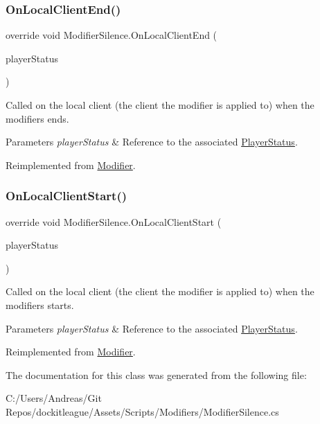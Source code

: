 \subsubsection{\texorpdfstring{On\+Local\+Client\+End()}{OnLocalClientEnd()}}
{\footnotesize\ttfamily override void Modifier\+Silence.\+On\+Local\+Client\+End (\begin{DoxyParamCaption}\item[{\hyperlink{class_player_status}{Player\+Status}}]{player\+Status }\end{DoxyParamCaption})\hspace{0.3cm}{\ttfamily [virtual]}}



Called on the local client (the client the modifier is applied to) when the modifiers ends. 


\begin{DoxyParams}{Parameters}
{\em player\+Status} & Reference to the associated \hyperlink{class_player_status}{Player\+Status}.\\
\hline
\end{DoxyParams}


Reimplemented from \hyperlink{class_modifier_a1ea2aa04b05628c1965570396e390281}{Modifier}.

\hypertarget{class_modifier_silence_a46d7fc89d95ab9e45013d79949254288}{}\label{class_modifier_silence_a46d7fc89d95ab9e45013d79949254288} 
\subsubsection{\texorpdfstring{On\+Local\+Client\+Start()}{OnLocalClientStart()}}
{\footnotesize\ttfamily override void Modifier\+Silence.\+On\+Local\+Client\+Start (\begin{DoxyParamCaption}\item[{\hyperlink{class_player_status}{Player\+Status}}]{player\+Status }\end{DoxyParamCaption})\hspace{0.3cm}{\ttfamily [virtual]}}



Called on the local client (the client the modifier is applied to) when the modifiers starts. 


\begin{DoxyParams}{Parameters}
{\em player\+Status} & Reference to the associated \hyperlink{class_player_status}{Player\+Status}.\\
\hline
\end{DoxyParams}


Reimplemented from \hyperlink{class_modifier_a5cce7ec6a5a595265a6bf5a6f7e40eb9}{Modifier}.



The documentation for this class was generated from the following file\+:\begin{DoxyCompactItemize}
\item 
C\+:/\+Users/\+Andreas/\+Git Repos/dockitleague/\+Assets/\+Scripts/\+Modifiers/Modifier\+Silence.\+cs\end{DoxyCompactItemize}
